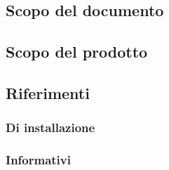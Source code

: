 \subsection{Scopo del documento}
\subsection{Scopo del prodotto}
\subsection{Riferimenti}
\subsubsection{Di installazione}
\subsubsection{Informativi}